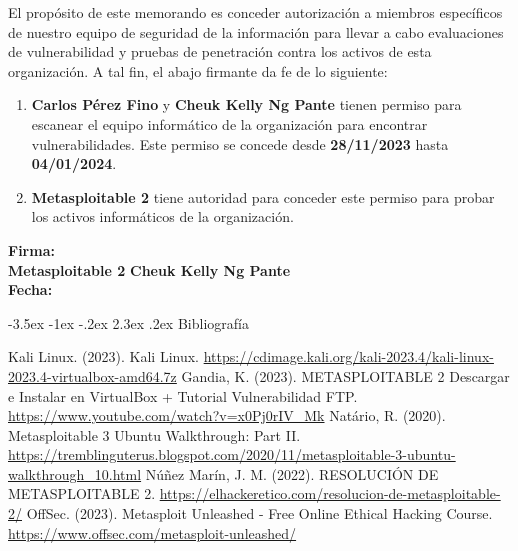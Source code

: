 \documentclass[11pt]{report}
\makeatletter
\renewcommand\chapter{\@startsection{chapter}{0}{\z@}%
    {-3.5ex \@plus -1ex \@minus -.2ex}%
    {2.3ex \@plus.2ex}%
    {\normalfont\Large\bfseries}}
\makeatother
\begin{document}
El propósito de este memorando es conceder autorización a miembros específicos de nuestro equipo de seguridad de la información para llevar a cabo evaluaciones de vulnerabilidad y pruebas de penetración contra los activos de esta organización. A tal fin, el abajo firmante da fe de lo siguiente:
\begin{enumerate}
    \item \textbf{Carlos Pérez Fino} y \textbf{Cheuk Kelly Ng Pante} tienen permiso para escanear el equipo informático de la organización para encontrar vulnerabilidades. Este permiso se concede desde \textbf{28/11/2023} hasta \textbf{04/01/2024}.
    \item \textbf{Metasploitable 2} tiene autoridad para conceder este permiso para probar los activos informáticos de la organización.
\end{enumerate}

\textbf{Firma:} \underline{\hspace{5cm}} \hspace{1cm} \underline{\hspace{5cm}} \\
\textbf{Metasploitable 2} \hspace{4.2cm} \textbf{Cheuk Kelly Ng Pante} \\
\textbf{Fecha:} \underline{\hspace{5cm}} \hspace{1cm} \underline{\hspace{5cm}}

\newpage

\chapter{Bibliografía} %
\begin{thebibliography}{99}
   Kali Linux. (2023). Kali Linux. \url{https://cdimage.kali.org/kali-2023.4/kali-linux-2023.4-virtualbox-amd64.7z}
   Gandia, K. (2023). METASPLOITABLE 2 Descargar e Instalar en VirtualBox + Tutorial Vulnerabilidad FTP. \url{https://www.youtube.com/watch?v=x0Pj0rIV_Mk}
   Natário, R. (2020). Metasploitable 3 Ubuntu Walkthrough: Part II. \url{https://tremblinguterus.blogspot.com/2020/11/metasploitable-3-ubuntu-walkthrough_10.html}
   Núñez Marín, J. M. (2022). RESOLUCIÓN DE METASPLOITABLE 2. \url{https://elhackeretico.com/resolucion-de-metasploitable-2/}
   OffSec. (2023). Metasploit Unleashed - Free Online Ethical Hacking Course. \url{https://www.offsec.com/metasploit-unleashed/}
\end{thebibliography}
\end{document}
